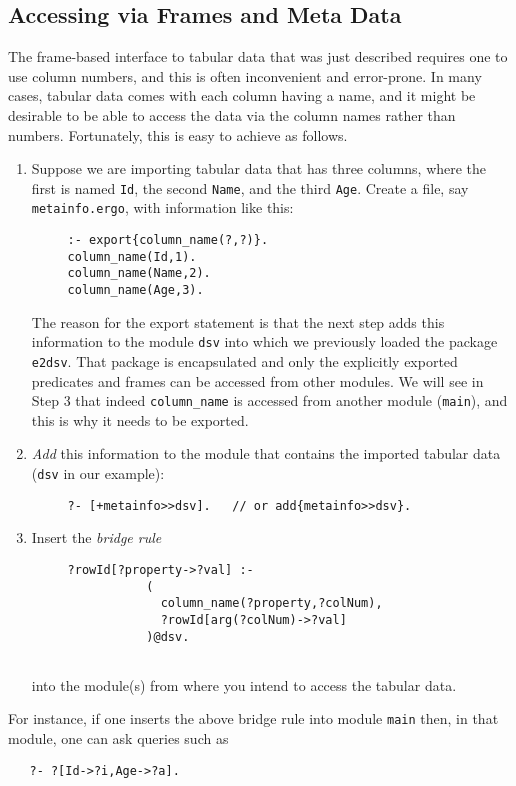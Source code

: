 \subsection{Accessing via Frames and Meta Data}

The frame-based interface to tabular data that was just described requires
one to use column numbers, and this is often inconvenient and error-prone.
In many cases, tabular data comes with each column having a name, and it
might be desirable to be able to access the data via the column names
rather than numbers. Fortunately, this is easy to achieve as follows.

\begin{enumerate}
\item 
  Suppose we are importing tabular data that has three columns, where the
  first is named \texttt{Id}, the second \texttt{Name}, and the third
  \texttt{Age}.   
  Create a file, say \texttt{metainfo.ergo}, with information like this:
\begin{verbatim}
     :- export{column_name(?,?)}.
     column_name(Id,1).  
     column_name(Name,2).  
     column_name(Age,3).  
\end{verbatim}
  The reason for the export statement is that the next step adds this
  information to the module \texttt{dsv} into which we previously loaded
  the package \texttt{e2dsv}. That package is encapsulated and only the
  explicitly exported predicates and frames can be accessed from other
  modules.   We will see in Step 3 that indeed \texttt{column\_name}
  is accessed from another module (\texttt{main}), and this is why it
  needs to be exported.
\item \emph{Add} this information to the module that contains the imported
  tabular data (\texttt{dsv}  in our example):
\begin{verbatim}
     ?- [+metainfo>>dsv].   // or add{metainfo>>dsv}. 
\end{verbatim}
  \item Insert the \emph{bridge rule} 
\begin{verbatim}
     ?rowId[?property->?val] :-
                (
                  column_name(?property,?colNum),
                  ?rowId[arg(?colNum)->?val]
                )@dsv.
              
\end{verbatim}
    into the module(s) from where you intend to access the tabular data.
\end{enumerate}
For instance, if one inserts the above bridge rule into module
\texttt{main} then, in that module, one can ask queries such as 
\begin{verbatim}
   ?- ?[Id->?i,Age->?a].
\end{verbatim}




